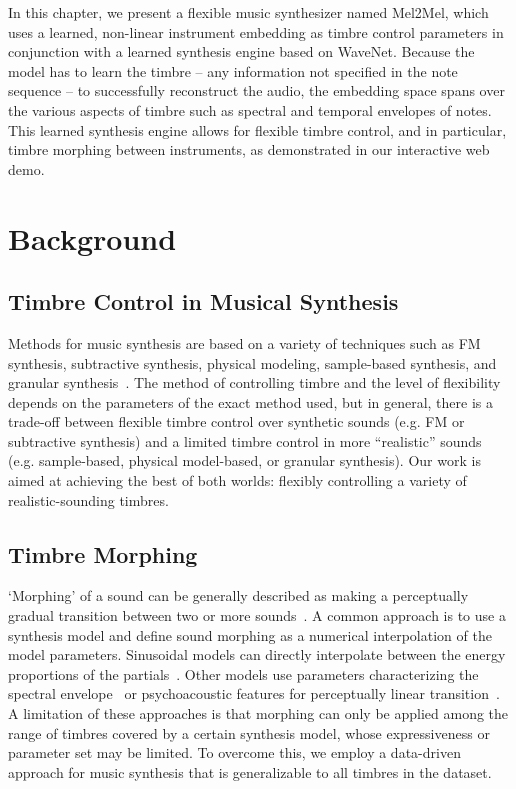 In this chapter, we present a flexible music synthesizer named Mel2Mel, which uses a learned, non-linear instrument embedding as timbre control parameters in conjunction with a learned synthesis engine based on WaveNet.
Because the model has to learn the timbre -- any information not specified in the note sequence -- to successfully reconstruct the audio, the embedding space spans over the various aspects of timbre such as spectral and temporal envelopes of notes.
This learned synthesis engine allows for flexible timbre control, and in particular, timbre morphing between instruments, as demonstrated in our interactive web demo.

\section{Background}\label{sec:background}

\subsection{Timbre Control in Musical Synthesis}

Methods for music synthesis are based on a variety of techniques such as FM synthesis, subtractive synthesis, physical modeling, sample-based synthesis, and granular synthesis~\cite{pejrolo2017creating}.
The method of controlling timbre and the level of flexibility depends on the parameters of the exact method used, but in general, there is a trade-off between flexible timbre control over synthetic sounds (e.g. FM or subtractive synthesis) and a limited timbre control in more ``realistic'' sounds (e.g. sample-based, physical model-based, or granular synthesis). %
Our work is aimed at achieving the best of both worlds: flexibly controlling a variety of realistic-sounding timbres.

\subsection{Timbre Morphing}

`Morphing' of a sound can be generally described as making a perceptually gradual transition between two or more sounds~\cite{caetano2010automatic}.
A common approach is to use a synthesis model and define sound morphing as a numerical interpolation of the model parameters.
Sinusoidal models can directly interpolate between the energy proportions of the partials~\cite{osaka1995timbre,boccardi2001sound}.
Other models use parameters characterizing the spectral envelope~\cite{slaney1996automatic,ezzat2005morphing} or psychoacoustic features for perceptually linear transition~\cite{caetano2013musical}.
A limitation of these approaches is that morphing can only be applied among the range of timbres covered by a certain synthesis model, whose expressiveness or parameter set may be limited.
To overcome this, we employ a data-driven approach for music synthesis that is generalizable to all timbres in the dataset.

